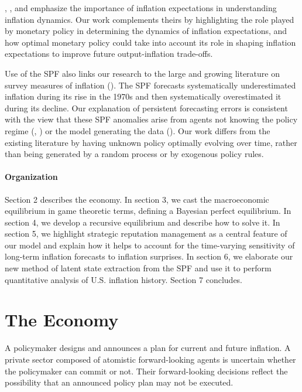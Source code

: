 \documentclass[12pt,letter,leqno]{article}
\theoremstyle{asn}
\theoremstyle{lem}
\theoremstyle{slem}
\theoremstyle{prop}
\theoremstyle{appprop}
\theoremstyle{rem}
\theoremstyle{defn}
\begin{document}
\cite{Hazelletal2022}, \cite{carvalho_anchored_2023}, and \cite{beaudry_dominant_2024} emphasize the importance of inflation expectations in understanding inflation dynamics. Our work complements theirs by highlighting the role played by monetary policy in determining the dynamics of inflation expectations, and how optimal monetary policy could take into account its role in shaping inflation expectations to improve future output-inflation trade-offs. 


Use of the SPF also links our research to the large and growing literature on survey measures of inflation (\cite{coibion_formation_2018}).  The SPF forecasts systematically underestimated inflation during its rise in the 1970s and then systematically overestimated it during its decline. Our explanation of persistent forecasting errors is consistent with
the view that these SPF anomalies arise from agents not knowing the policy regime (\cite{evans_inflation_1993}, \cite{coibion_formation_2018}) or the model generating the data (\cite{NBERw29495}). Our work differs from the existing literature by having unknown policy optimally evolving over time, rather than being generated by a random process or by exogenous policy rules.

\paragraph{Organization} Section 2 describes the economy. In section 3, we cast the macroeconomic equilibrium in game theoretic terms, defining a Bayesian perfect equilibrium. In section 4, we develop a recursive equilibrium and describe how to solve it. In section 5, we highlight strategic reputation management as a central feature of our model and explain how it helps to account for the time-varying sensitivity of long-term inflation forecasts to inflation surprises. In section 6, we elaborate our new method of latent state extraction from the SPF and use it to perform quantitative analysis of U.S. inflation history. Section 7 concludes. 

\section{The Economy}

A policymaker designs and announces a plan for
current and future inflation. A private sector composed of atomistic forward-looking agents is uncertain whether the policymaker can commit or not. Their forward-looking decisions reflect the
possibility that an announced policy plan may not be executed.
\end{document}
